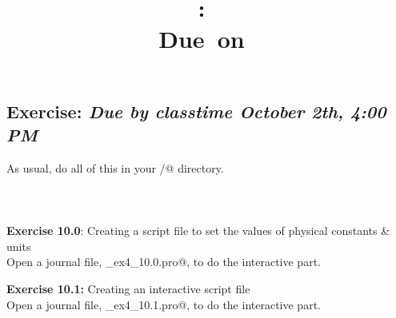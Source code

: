 \documentclass{article}
\title{\vspace{2in}\textmd{\textbf{\hmwkClass:\ \hmwkTitle}}\\\normalsize\vspace{0.1in}\small{Due\ on\ \hmwkDueDate}\\\vspace{0.1in}\large{}\vspace{3in}}
\date{}
\newcommand{\exDueDate}{October 2th, 4:00 PM}
\begin{document}
 \begin{spacing}{1.0}
 
 
 
 \section{\textbf{Exercise:} \emph{  Due by classtime \exDueDate}}
 
 As usual, do all of this in your /@ directory.  
 ~\\
~\\ 
 ~\\
~\\ 
 \textbf{Exercise 10.0}: Creating a script file to set the values of physical constants \& units  \\
 Open a journal file, \verb@YourName_ex4_10.0.pro@, to do the interactive part. 

 \textbf{Exercise 10.1:} Creating an interactive script file  \\
 Open a journal file, \verb@YourName_ex4_10.1.pro@, to do the interactive part. 


\end{spacing}
\end{document}
